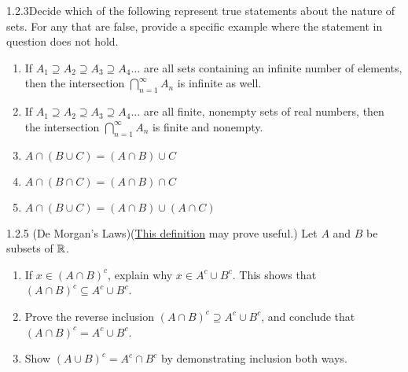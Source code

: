 \begin{exercise}
    {1.2.3}Decide which of the following represent true statements about
    the nature of sets. For any that are false, provide a specific example where the
    statement in question does not hold.
    \begin{enumerate}
        \item If \(A_1 \supseteq A_2 \supseteq A_3 \supseteq A_4\dots\) are all sets containing an infinite number of
              elements, then the intersection \(\bigcap^\infty_{n=1} A_n\) is infinite as well.
        \item If \(A_1 \supseteq A_2 \supseteq A_3 \supseteq A_4\dots\) are all finite, nonempty sets of real numbers,
              then the intersection \(\bigcap^\infty_{n=1} A_n\) is finite and nonempty.
        \item \(A \cap (B \cup C) = (A \cap B) \cup C\)
        \item \(A \cap (B \cap C) = (A \cap B) \cap C\)
        \item \(A \cap (B \cup C) = (A \cap B) \cup (A \cap C)\)
    \end{enumerate}
\end{exercise}


\begin{exercise}
    {1.2.5 (De Morgan's Laws)}(\hyperref[def:1.2.1]{This definition} may prove useful.) Let \(A\) and \(B\) be subsets of \(\mathbb{R}\).
    \begin{enumerate}
        \item  If \(x \in (A \cap B)^c\), explain why \(x \in A^c \cup B^c\). This shows that \((A \cap B)^c \subseteq A^c \cup B^c\).
        \item Prove the reverse inclusion \((A \cap B)^c \supseteq A^c \cup B^c\), and conclude that \((A \cap B)^c = A^c \cup B^c\).
        \item Show \((A \cup B)^c = A^c \cap B^c\) by demonstrating inclusion both ways.
    \end{enumerate}
\end{exercise}

